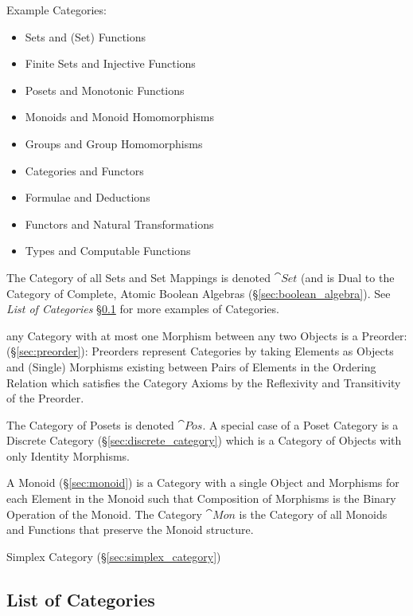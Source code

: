 Example Categories:
\begin{itemize}
\item Sets and (Set) Functions
\item Finite Sets and Injective Functions
\item Posets and Monotonic Functions
\item Monoids and Monoid Homomorphisms
\item Groups and Group Homomorphisms
\item Categories and Functors
\item Formulae and Deductions
\item Functors and Natural Transformations
\item Types and Computable Functions
\end{itemize}
The Category of all Sets and Set Mappings is denoted $\cat{Set}$
(and is Dual to the Category of Complete, Atomic Boolean Algebras
(\S\ref{sec:boolean_algebra}). See \emph{List of Categories}
\S\ref{sec:categories_list} for more examples of Categories.

any Category with at most one Morphism between any two Objects is a Preorder:
(\S\ref{sec:preorder}): Preorders represent Categories by taking Elements as
Objects and (Single) Morphisms existing between Pairs of Elements in the
Ordering Relation which satisfies the Category Axioms by the Reflexivity and
Transitivity of the Preorder.

The Category of Posets is denoted $\cat{Pos}$. A special case of a
Poset Category is a Discrete Category (\S\ref{sec:discrete_category})
which is a Category of Objects with only Identity Morphisms.

A Monoid (\S\ref{sec:monoid}) is a Category with a single Object and
Morphisms for each Element in the Monoid such that Composition of
Morphisms is the Binary Operation of the Monoid. The Category
$\cat{Mon}$ is the Category of all Monoids and Functions that
preserve the Monoid structure.

Simplex Category (\S\ref{sec:simplex_category})



\subsection{List of Categories}\label{sec:categories_list}

